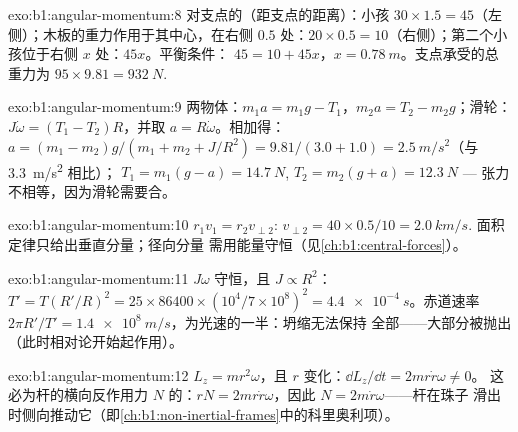 \begin{solution}{exo:b1:angular-momentum:8}
对支点的（距支点的距离）：小孩 $30 \times 1.5 =
45$（左侧）；木板的重力作用于其中心，在右侧 $0.5$ 处：$20 \times
0.5 = 10$（右侧）；第二个小孩位于右侧 $x$ 处：$45x$。平衡条件：
$45 = 10 + 45x$，$x = \qty{0.78}{m}$。支点承受的总重力为
$95 \times 9.81 = \qty{932}{N}$.
\end{solution}

\begin{solution}{exo:b1:angular-momentum:9}
两物体：$m_1a = m_1g - T_1$，$m_2a = T_2 - m_2g$；滑轮：$J\dot\omega =
(T_1 - T_2)R$，并取 $a = R\dot\omega$。相加得：$a = (m_1 - m_2)g/(m_1 + m_2 +
J/R^2) = 9.81/(3.0 + 1.0) = \qty{2.5}{m/s^2}$（与 \qty{3.3}{m/s^2} 相比）；
$T_1 = m_1(g - a) = \qty{14.7}{N}$, $T_2 = m_2(g + a) = \qty{12.3}{N}$ ---
张力不相等，因为滑轮需要合。
\end{solution}

\begin{solution}{exo:b1:angular-momentum:10}
$r_1v_1 = r_2v_{\perp 2}$: $v_{\perp 2} = 40 \times 0.5/10 = \qty{2.0}{km/s}$.
面积定律只给出垂直分量；径向分量
需用能量守恒（见\cref{ch:b1:central-forces}）。
\end{solution}

\begin{solution}{exo:b1:angular-momentum:11}
$J\omega$ 守恒，且 $J \propto R^2$：$T' = T(R'/R)^2 = 25 \times 86400
\times (10^4/7\times10^8)^2 = \qty{4.4e-4}{s}$。赤道速率 $2\pi R'/T'
= \qty{1.4e8}{m/s}$，为光速的一半：坍缩无法保持
全部——大部分被抛出（此时相对论开始起作用）。
\end{solution}

\begin{solution}{exo:b1:angular-momentum:12}
$L_z = mr^2\omega$，且 $r$ 变化：$\dd L_z/\dd t = 2mr\dot r\omega \neq 0$。
这必为杆的横向反作用力 $N$ 的：$rN =
2mr\dot r\omega$，因此 $N = 2m\dot r\omega$——杆在珠子
滑出时侧向推动它（即\cref{ch:b1:non-inertial-frames}中的科里奥利项）。
\end{solution}


